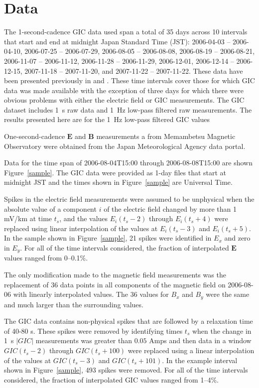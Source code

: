 \documentclass[draft,linenumbers]{agujournal2018}
\begin{document}
\section{Data}

The 1-second-cadence GIC data used span a total of 35 days across 10 intervals that start and end at midnight Japan Standard Time (JST): 2006-04-03 -- 2006-04-10, 2006-07-25 -- 2006-07-29, 2006-08-05 -- 2006-08-08, 2006-08-19 -- 2006-08-21, 2006-11-07 -- 2006-11-12, 2006-11-28 -- 2006-11-29, 2006-12-01, 2006-12-14 -- 2006-12-15, 2007-11-18 -- 2007-11-20, and 2007-11-22 -- 2007-11-22. These data have been presented previously in \citet{Watari2009} and \cite{Watari2015}. These time intervals cover those for which GIC data was made available with the exception of three days for which there were obvious problems with either the electric field or GIC measurements. The GIC dataset includes 1~s raw data and 1~Hz low-pass filtered raw measurements. The results presented here are for the 1~Hz low-pass filtered GIC values

One-second-cadence $\mathbf{E}$ and $\mathbf{B}$ measurements a from Memambetsu Magnetic Observatory were obtained from the Japan Meteorological Agency data portal.

Data for the time span of 2006-08-04T15:00 through 2006-08-08T15:00 are shown Figure~\ref{sample}. The GIC data were provided as 1-day files that start at midnight JST and the times shown in Figure~\ref{sample} are Universal Time.

Spikes in the electric field measurements were assumed to be unphysical when the absolute value of a component $i$ of the electric field changed by more than 1 mV/km at time $t_s$, and the values $E_i(t_s-2)$ through $E_i(t_s+4)$ were replaced using linear interpolation of the values at $E_i(t_s-3)$ and $E_i(t_s + 5)$. In the sample shown in Figure~\ref{sample}, 21 spikes were identified in $E_x$ and zero in $E_y$. For all of the time intervals considered, the fraction of interpolated $\mathbf{E}$ values ranged from 0--0.1\%.

The only modification made to the magnetic field measurements was the replacement of 36 data points in all components of the magnetic field on 2006-08-06 with linearly interpolated values. The 36 values for $B_x$ and $B_y$ were the same and much larger than the surrounding values.

The GIC data contains non-physical spikes that are followed by a relaxation time of 40-80 s. These spikes were removed by identifying times $t_s$ when the change in 1~s $|GIC|$ measurements was greater than $0.05$ Amps and then data in a window $GIC(t_s-2)$ through $GIC(t_s+100)$ were replaced using a linear interpolation of the values at $GIC(t_s-3)$ and $GIC(t_s + 101)$. In the example interval shown in Figure~\ref{sample}, 493 spikes were removed. For all of the time intervals considered, the fraction of interpolated GIC values ranged from 1--4\%.
\end{document}
